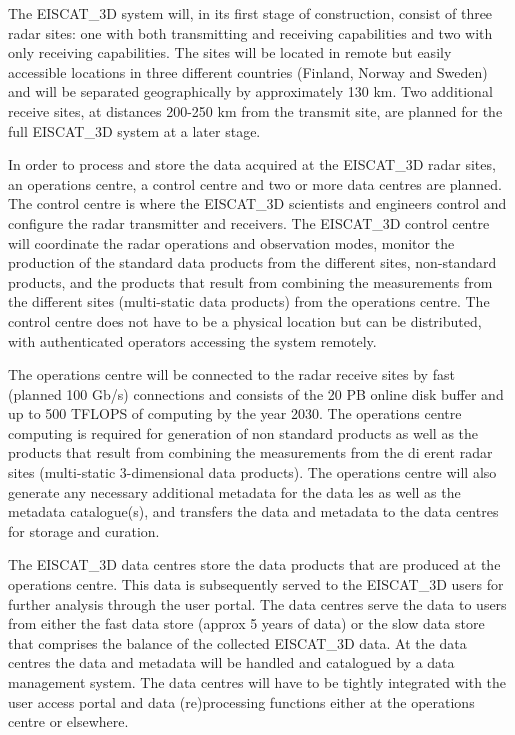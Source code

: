 \documentclass[fleqn,10pt]{wlscirep}
\begin{document}
{The EISCAT\_3D system will, in its first stage of construction, consist of three radar sites: one with both transmitting and receiving  capabilities and two with only receiving capabilities. The sites will be located in remote but easily accessible locations in three different countries (Finland, Norway and Sweden) and will be separated geographically by approximately 130 km. Two additional receive sites, at distances 200-250 km from the transmit site, are planned for the full EISCAT\_3D system at a later stage. 

In order to process and store the data acquired at the EISCAT\_3D radar sites, an operations centre, a control centre and two or more data centres are planned. The control centre is where the EISCAT\_3D scientists and engineers control and configure the radar transmitter and receivers. The EISCAT\_3D control centre will coordinate the radar operations and observation modes, monitor the production of the standard data products from the different sites, non-standard products, and the products that result from combining the measurements from the different sites (multi-static data products) from the operations centre. The control centre does not have to be a physical location but can be distributed, with authenticated operators accessing the system remotely.

The operations centre will be connected to the radar receive sites by fast (planned 100 Gb/s)
connections and consists of the 20 PB online disk buffer and up to  500 TFLOPS of computing by the year 2030. The operations centre computing is required for generation of non standard products as well as the products that result from combining the measurements from the di
erent radar sites (multi-static 3-dimensional data products). The operations centre will also generate any necessary additional metadata for the data les as well as the metadata catalogue(s), and transfers the data and metadata to the data centres for storage and curation.

The EISCAT\_3D data centres store the data products that are produced at the operations centre. This data is subsequently served to the EISCAT\_3D users for further analysis through the user portal. The data centres serve the data to users from either the fast data store (approx 5 years of data) or the slow data store that comprises the balance of the collected EISCAT\_3D data. At the data centres the data and metadata will be handled and catalogued by a data management system. The data centres will have to be tightly integrated with the user access portal and data (re)processing functions either at the operations centre or elsewhere.

}
\end{document}
